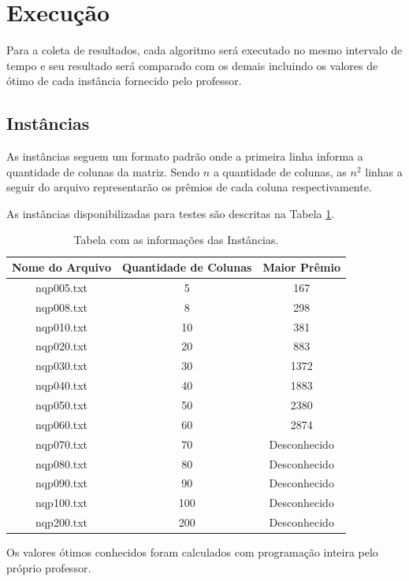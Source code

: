 \documentclass[12pt]{article}
\begin{document}
\section{Execução} \label{sec:exec}
	Para a coleta de resultados, cada algoritmo será executado no mesmo intervalo de tempo e seu resultado será comparado com os demais incluindo os valores de ótimo de cada instância fornecido pelo professor.

	\subsection{Instâncias}
		As instâncias seguem um formato padrão onde a primeira linha informa a quantidade de colunas da matriz. Sendo $ n $ a quantidade de colunas, as $ n^2 $ linhas a seguir do arquivo representarão os prêmios de cada coluna respectivamente.

		As instâncias disponibilizadas para testes são descritas na Tabela \ref{tab:inst}.

		\begin{table}[H]
			\centering
			\caption{Tabela com as informações das Instâncias.} \label{tab:inst}
			\begin{tabular}{c|cc}
				\hline
				\textbf{Nome do Arquivo} & \textbf{Quantidade de Colunas} & \textbf{Maior Prêmio} \\ \hline \hline
				nqp005.txt & 5   & 167 \\
				nqp008.txt & 8   & 298 \\
				nqp010.txt & 10  & 381 \\
				nqp020.txt & 20  & 883 \\
				nqp030.txt & 30  & 1372 \\
				nqp040.txt & 40  & 1883 \\
				nqp050.txt & 50  & 2380 \\
				nqp060.txt & 60  & 2874 \\
				nqp070.txt & 70  & Desconhecido \\
				nqp080.txt & 80  & Desconhecido \\
				nqp090.txt & 90  & Desconhecido \\
				nqp100.txt & 100 & Desconhecido \\
				nqp200.txt & 200 & Desconhecido \\ \hline
			\end{tabular}
		\end{table}

		Os valores ótimos conhecidos foram calculados com programação inteira pelo próprio professor.
\end{document}
